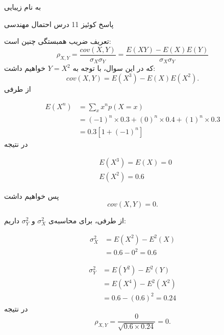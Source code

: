 \documentclass{article}
\newcommand{\eqn}[1]{
\[\begin{split}
#1
\end{split}\]
}
\begin{document}
\LARGE
\begin{center}

به نام زیبایی


پاسخ کوئیز 11 درس احتمال مهندسی

\end{center}
\hrulefill
\large

تعریف ضریب همبستگی چنین است:
$$
\rho_{X,Y}=\frac{cov(X,Y)}{\sigma_X\sigma_Y}=\frac{E(XY)-E(X)E(Y)}{\sigma_X\sigma_Y}
$$
که در این سوال، با توجه به 
$
Y=X^2
$
خواهیم داشت:
$$
cov(X,Y)=E(X^3)-E(X)E(X^2).
$$
از طرفی
\eqn{
E(X^n)&=\sum_x x^np(X=x)\\&=
(-1)^n\times 0.3+
(0)^n\times 0.4+
(1)^n\times 0.3
\\&=0.3[1+(-1)^n]
}{}
در نتیجه
\eqn{
&
E(X^3)=E(X)=0
\\&E(X^2)=0.6
}
پس خواهیم داشت
$$
cov(X,Y)=0.
$$

از طرفی، برای محاسبه‌ی 
$
\sigma_X^2
$
و
$
\sigma_Y^2
$
داریم:
\eqn{
\sigma_X^2&=E(X^2)-E^2(X)
\\&=0.6-0^2=0.6
}{}
\eqn{
\sigma_Y^2&=E(Y^2)-E^2(Y)
\\&=E(X^4)-E^2(X^2)
\\&=0.6-(0.6)^2=0.24
}{}
در نتیجه
$$
\rho_{X,Y}=\frac{0}{\sqrt{0.6\times 0.24}}=0.
$$
\end{document}
